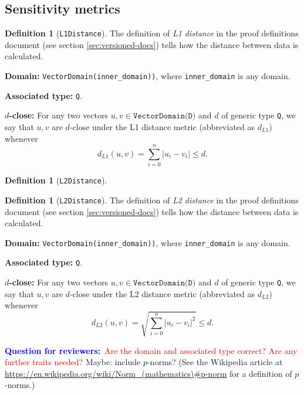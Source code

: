 \documentclass[11pt,a4paper]{article}
\theoremstyle{definition}
\newtheorem{definition}[theorem]{Definition}
\newcommand{\metricDefn}[1]{The definition of \emph{#1} in the proof definitions document (see section \ref{sec:versioned-docs}) tells how the distance between data is calculated.}
\newcommand{\questionr}[1]{\textcolor{blue}{\textbf{Question for reviewers:}}\textcolor{red}{~#1}}
\begin{document}
\subsection{Sensitivity metrics}
\begin{definition}[\texttt{L1Distance}]
    \metricDefn{L1 distance}
    \item \textbf{Domain:} \texttt{VectorDomain(inner\_domain))}, where \texttt{inner\_domain} is any domain.
    \item \textbf{Associated type:} \texttt{Q}.
    \item \textbf{$d$-close:} For any two vectors $u, v \in \texttt{VectorDomain(D)}$ and $d$ of generic type \texttt{Q}, we say that $u, v$ are $d$-close under the L1 distance metric (abbreviated as $d_{L1}$) whenever
    \[
        d_{L1}(u, v) = \sum_{i=0}^n |u_i - v_i| \leq d.
    \]
\end{definition}
\begin{definition}[\texttt{L2Distance}]
    \begin{definition}[\texttt{L2Distance}]
    \metricDefn{L2 distance}
    \item \textbf{Domain:} \texttt{VectorDomain(inner\_domain))}, where \texttt{inner\_domain} is any domain.
    \item \textbf{Associated type:} \texttt{Q}.
    \item \textbf{$d$-close:} For any two vectors $u, v \in \texttt{VectorDomain(D)}$ and $d$ of generic type \texttt{Q}, we say that $u, v$ are $d$-close under the L2 distance metric (abbreviated as $d_{L2}$) whenever
    \[
        d_{L2}(u, v) = \sqrt{\sum_{i=0}^n |u_i - v_i|^2} \leq d.
    \]
\end{definition}
\end{definition}
\questionr{Are the domain and associated type correct? Are any further traits needed?}
Maybe: include $p$-norms? (See the Wikipedia article at \url{https://en.wikipedia.org/wiki/Norm_(mathematics)\#p-norm} for a definition of $p$-norms.)
\end{document}
